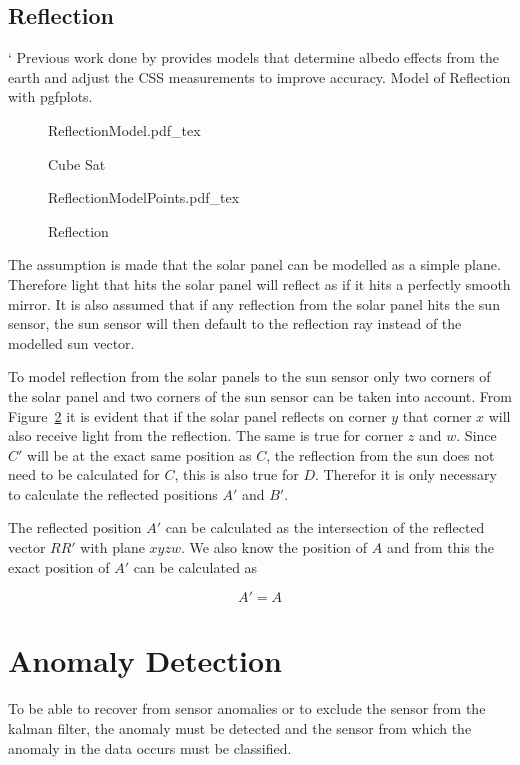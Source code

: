 \documentclass[letterpaper, 10 pt, conference]{ieeeconf}  %
\begin{document}
\subsection{Reflection}`
Previous work done by \textcite{Cilden-Guler2021} provides models that determine albedo effects from the earth and adjust the CSS measurements to improve accuracy.
Model of Reflection with pgfplots.

\begin{figure}[!htb]
	\centering
	\def\svgwidth{7cm}
	{ReflectionModel.pdf_tex}
	\caption{Cube Sat}
	\label{fig:Reflection}
\end{figure}

\begin{figure}[!htb]
	\centering
	\def\svgwidth{7cm}
	{ReflectionModelPoints.pdf_tex}
	\caption{Reflection}
	\label{fig:ReflectionPoints}
\end{figure}

The assumption is made that the solar panel can be modelled as a simple plane. Therefore light that hits the solar panel will reflect as if it hits a perfectly smooth mirror. It is also assumed that if any reflection from the solar panel hits the sun sensor, the sun sensor will then default to the reflection ray instead of the modelled sun vector. 

To model reflection from the solar panels to the sun sensor only two corners of the solar panel and two corners of the sun sensor can be taken into account. From Figure~\ref{fig:ReflectionPoints} it is evident that if the solar panel reflects on corner $y$ that corner $x$ will also receive light from the reflection. The same is true for corner $z$ and $w$. Since $C'$ will be at the exact same position as $C$, the reflection from the sun does not need to be calculated for $C$, this is also true for $D$. Therefor it is only necessary to calculate the reflected positions $A'$ and $B'$.

The reflected position $A'$ can be calculated as the intersection of the reflected vector $RR'$ with plane $xyzw$. We also know the position of $A$ and from this the exact position of $A'$ can be calculated as

\begin{equation}
A' = A
\end{equation}

\section{Anomaly Detection}
To be able to recover from sensor anomalies or to exclude the sensor from the kalman filter, the anomaly must be detected and the sensor from which the anomaly in the data occurs must be classified.
\end{document}
